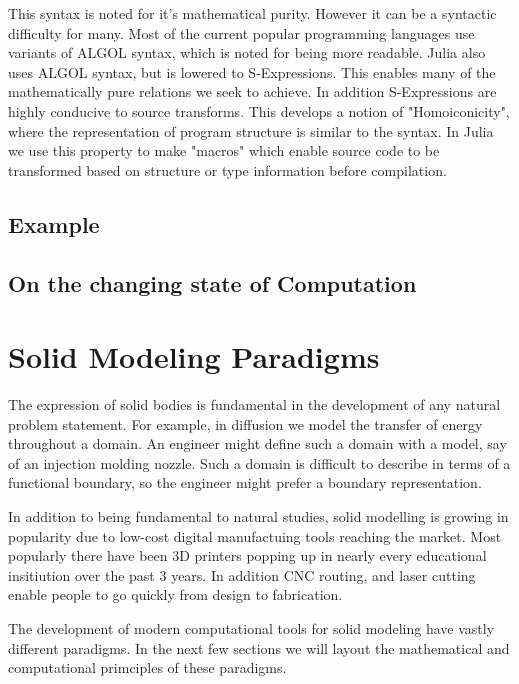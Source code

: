 \documentclass[a4paper]{article}
\begin{document}
This syntax is noted for it's mathematical purity.
However it can be a syntactic difficulty for many.
Most of the current popular programming languages
use variants of ALGOL syntax, which is noted for being more readable.
\cite{Hoare}
Julia also uses ALGOL syntax, but is lowered to S-Expressions. This enables
many of the mathematically pure relations we seek to achieve.
In addition S-Expressions are highly conducive to source transforms.
This develops a notion of "Homoiconicity", where the representation of
program structure is similar to the syntax. In Julia we use this property
to make "macros" which enable source code to be transformed based on
structure or type information before compilation.



\subsection{Example}


\subsection{On the changing state of Computation}

\cite{Shamos_1999}

\section{Solid Modeling Paradigms}

The expression of solid bodies is fundamental in the development of any
natural problem statement. For example, in diffusion we model the transfer of
energy throughout a domain. An engineer might define such a domain with a
model, say of an injection molding nozzle. Such a domain is difficult to
describe in terms of a functional boundary, so the engineer might prefer
a boundary representation.

In addition to being fundamental to natural studies, solid modelling is growing
in popularity due to low-cost digital manufactuing tools reaching the market.
Most popularly there have been 3D printers popping up in nearly every educational
insitiution over the past 3 years. In addition CNC routing, and laser cutting
enable people to go quickly from design to fabrication.


The development of modern
computational tools for solid modeling have vastly different paradigms. In
the next few sections we will layout the mathematical and computational
primciples of these paradigms.
\end{document}
